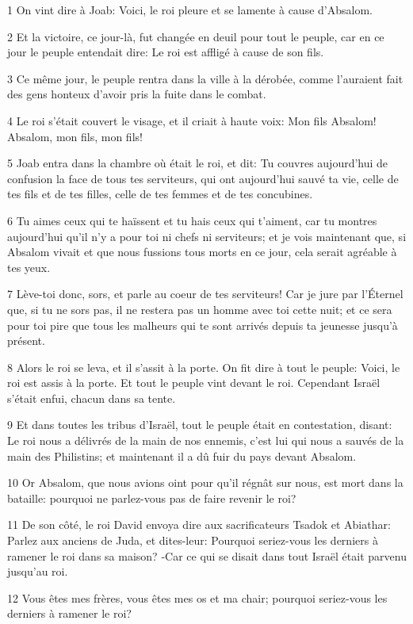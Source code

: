 \par 1 On vint dire à Joab: Voici, le roi pleure et se lamente à cause d'Absalom.
\par 2 Et la victoire, ce jour-là, fut changée en deuil pour tout le peuple, car en ce jour le peuple entendait dire: Le roi est affligé à cause de son fils.
\par 3 Ce même jour, le peuple rentra dans la ville à la dérobée, comme l'auraient fait des gens honteux d'avoir pris la fuite dans le combat.
\par 4 Le roi s'était couvert le visage, et il criait à haute voix: Mon fils Absalom! Absalom, mon fils, mon fils!
\par 5 Joab entra dans la chambre où était le roi, et dit: Tu couvres aujourd'hui de confusion la face de tous tes serviteurs, qui ont aujourd'hui sauvé ta vie, celle de tes fils et de tes filles, celle de tes femmes et de tes concubines.
\par 6 Tu aimes ceux qui te haïssent et tu hais ceux qui t'aiment, car tu montres aujourd'hui qu'il n'y a pour toi ni chefs ni serviteurs; et je vois maintenant que, si Absalom vivait et que nous fussions tous morts en ce jour, cela serait agréable à tes yeux.
\par 7 Lève-toi donc, sors, et parle au coeur de tes serviteurs! Car je jure par l'Éternel que, si tu ne sors pas, il ne restera pas un homme avec toi cette nuit; et ce sera pour toi pire que tous les malheurs qui te sont arrivés depuis ta jeunesse jusqu'à présent.
\par 8 Alors le roi se leva, et il s'assit à la porte. On fit dire à tout le peuple: Voici, le roi est assis à la porte. Et tout le peuple vint devant le roi. Cependant Israël s'était enfui, chacun dans sa tente.
\par 9 Et dans toutes les tribus d'Israël, tout le peuple était en contestation, disant: Le roi nous a délivrés de la main de nos ennemis, c'est lui qui nous a sauvés de la main des Philistins; et maintenant il a dû fuir du pays devant Absalom.
\par 10 Or Absalom, que nous avions oint pour qu'il régnât sur nous, est mort dans la bataille: pourquoi ne parlez-vous pas de faire revenir le roi?
\par 11 De son côté, le roi David envoya dire aux sacrificateurs Tsadok et Abiathar: Parlez aux anciens de Juda, et dites-leur: Pourquoi seriez-vous les derniers à ramener le roi dans sa maison? -Car ce qui se disait dans tout Israël était parvenu jusqu'au roi.
\par 12 Vous êtes mes frères, vous êtes mes os et ma chair; pourquoi seriez-vous les derniers à ramener le roi?
